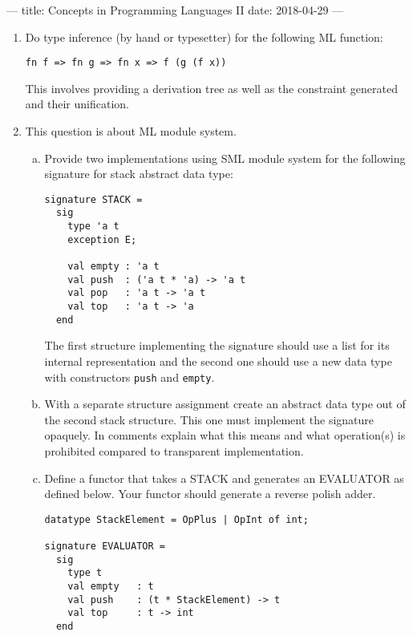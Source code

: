 ---
title: Concepts in Programming Languages II
date: 2018-04-29
---



\begin{enumerate}
  \item Do type inference (by hand or typesetter) for the following ML function:

    \begin{verbatim}
fn f => fn g => fn x => f (g (f x))
    \end{verbatim}

    This involves providing a derivation tree as well as the constraint
    generated and their unification.

  \item This question is about ML module system.

    \begin{enumerate}[(a)]
      \item Provide two implementations using SML module system for the
        following signature for stack abstract data type:

        \begin{verbatim}
signature STACK =
  sig
    type 'a t
    exception E;

    val empty : 'a t
    val push  : ('a t * 'a) -> 'a t
    val pop   : 'a t -> 'a t
    val top   : 'a t -> 'a
  end
      \end{verbatim}

        The first structure implementing the signature should use a list for
        its internal representation and the second one should use a new data
        type with constructors \texttt{push} and \texttt{empty}.

      \item With a separate structure assignment create an abstract data type
        out of the second stack structure. This one must implement the
        signature opaquely.  In comments explain what this means and what
        operation(s) is prohibited compared to transparent implementation.

      \item Define a functor that takes a STACK and generates an EVALUATOR as
        defined below. Your functor should generate a reverse polish adder.

        \begin{verbatim}
datatype StackElement = OpPlus | OpInt of int;

signature EVALUATOR =
  sig
    type t
    val empty   : t
    val push    : (t * StackElement) -> t
    val top     : t -> int
  end
        \end{verbatim}
    \end{enumerate}


\end{enumerate}
